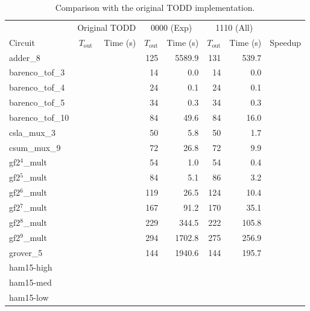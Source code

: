 \begin{table}[htbp]
\centering
\caption{Comparison with the original TODD implementation.}
\label{tab:baseline_comparison}
\footnotesize
\begin{tabular}{l|rr|rr|rr|r}
\hline
 & \multicolumn{2}{c|}{Original TODD} & \multicolumn{2}{c|}{0000 (Exp)} & \multicolumn{2}{c|}{1110 (All)} & \\
Circuit & $T_\mathrm{out}$ & Time (s) & $T_\mathrm{out}$ & Time (s) & $T_\mathrm{out}$ & Time (s) & Speedup \\
\hline
adder\_8        &     &        & 125 & 5589.9 & 131 &  539.7 &        \\
barenco\_tof\_3  &     &        &  14 &    0.0 &  14 &    0.0 &        \\
barenco\_tof\_4  &     &        &  24 &    0.1 &  24 &    0.1 &        \\
barenco\_tof\_5  &     &        &  34 &    0.3 &  34 &    0.3 &        \\
barenco\_tof\_10 &     &        &  84 &   49.6 &  84 &   16.0 &        \\
csla\_mux\_3     &     &        &  50 &    5.8 &  50 &    1.7 &        \\
csum\_mux\_9     &     &        &  72 &   26.8 &  72 &    9.9 &        \\
gf2$^4$\_mult    &     &        &  54 &    1.0 &  54 &    0.4 &        \\
gf2$^5$\_mult    &     &        &  84 &    5.1 &  86 &    3.2 &        \\
gf2$^6$\_mult    &     &        & 119 &   26.5 & 124 &   10.4 &        \\
gf2$^7$\_mult    &     &        & 167 &   91.2 & 170 &   35.1 &        \\
gf2$^8$\_mult    &     &        & 229 &  344.5 & 222 &  105.8 &        \\
gf2$^9$\_mult    &     &        & 294 & 1702.8 & 275 &  256.9 &        \\
grover\_5        &     &        & 144 & 1940.6 & 144 &  195.7 &        \\
ham15-high      &     &        &     &        &     &        &        \\
ham15-med       &     &        &     &        &     &        &        \\
ham15-low       &     &        &     &        &     &        &        \\

\end{tabular}
\end{table}
